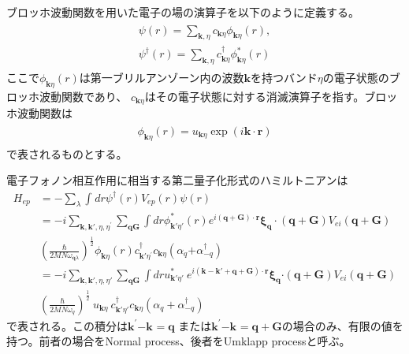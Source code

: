 \documentclass[letterpaper,10pt,dvipdfmx]{sphinxhowto}
\begin{document}
ブロッホ波動関数を用いた電子の場の演算子を以下のように定義する。
\begin{equation*}
\begin{split}\begin{aligned}
\psi(r) = \sum_{\mathbf{k},\eta}c_{\mathbf{k}\eta}\phi_{\mathbf{k}\eta}(r), \\
\psi^{\dagger}\left( r \right) =
\sum_{\mathbf{k},\eta}{c_{\mathbf{k}\eta}^{\dagger}\phi_{\mathbf{k}\eta}^{*}(r)}\end{aligned}\end{split}
\end{equation*}
ここで\(\phi_{\mathbf{k}\eta}(r)\)は第一ブリルアンゾーン内の波数\(\mathbf{k}\)を持つバンド\(\eta\)の電子状態のブロッホ波動関数であり、
\(c_{\mathbf{k}\eta}\)はその電子状態に対する消滅演算子を指す。ブロッホ波動関数は
\begin{equation*}
\begin{split}\begin{aligned}
\phi_{\mathbf{k}\eta}\left( r \right) = u_{\mathbf{k}\eta}\exp{\left(
i\mathbf{k} \cdot \mathbf{r} \right)}\end{aligned}\end{split}
\end{equation*}
で表されるものとする。

電子フォノン相互作用に相当する第二量子化形式のハミルトニアンは
\begin{equation}\label{equation:index:Hep}
\begin{split}H_{ep} &= - \sum_{\lambda}\int_{}^{}dr \psi^{\dagger}(r)V_{ep}(r)\psi(r) \\
&= -i\sum_{\mathbf{k,k'},\eta,\eta^{'}} \sum_{\mathbf{qG}}
\int dr\phi^*_{\mathbf{k'}\eta'}(r)e^{i(\mathbf{q+G}) \cdot
\mathbf{r}} \mathbf{\xi}_{\mathbf{q}}\cdot
(\mathbf{q+G})V_{ei}( \mathbf{q+G}) \nonumber \\
&\left(\frac{\hbar}{2MN\omega_{\mathbf{q}\lambda}} \right)^{\frac{1}{2}}
\phi_{\mathbf{k}\eta}(r)c_{\mathbf{k'}\eta^{'}}^{\dagger}
c_{\mathbf{k}\eta}\left(\alpha_{q}{+ \alpha_{-q}^{\dagger}}
\right) \nonumber \\
&= -i\sum_{\mathbf{k,k'},\eta,\eta'}\sum_{\mathbf{qG}}\int dr
u_{\mathbf{k'}\eta'}^{*}\ e^{i (\mathbf{k -k'+ q +G}) \cdot \mathbf{r}}
\mathbf{\xi}_{\mathbf{q}}\mathbf{\cdot}(\mathbf {q + G})V_{ei}\left( \mathbf{q}
+ \mathbf{G} \right)\nonumber \\
& \left( \frac{\hbar}{2MN\omega_{q}}
\right)^{\frac{1}{2}}\ u_{\mathbf{k}\eta}\ c_{\mathbf{k'}\eta'}^{\dagger}c_{\mathbf{k}\eta}
\left( \alpha_{q}+ \alpha_{-q}^{\dagger} \right)\end{split}
\end{equation}
で表される。この積分は\(\mathbf{k}^{\mathbf{'}}\mathbf{-}\mathbf{k}^{}\mathbf{= q}\)
または\(\mathbf{k}^{\mathbf{'}}\mathbf{-}\mathbf{k}^{} = \mathbf{q} + \mathbf{G}\)の場合のみ、有限の値を持つ。前者の場合をNormal
process、後者をUmklapp processと呼ぶ。
\end{document}
